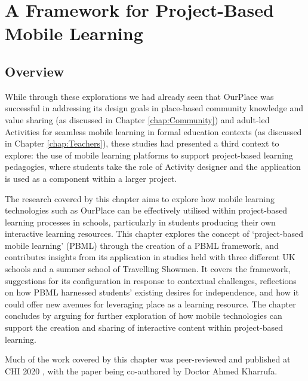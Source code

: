\chapter{A Framework for Project-Based Mobile Learning}
\label{chap:student-created}

\section{Overview}
While through these explorations we had already seen that OurPlace was successful in addressing its design goals in place-based community knowledge and value sharing (as discussed in Chapter \ref{chap:Community}) and adult-led Activities for seamless mobile learning in formal education contexts (as discussed in Chapter \ref{chap:Teachers}), these studies had presented a third context to explore: the use of mobile learning platforms to support project-based learning pedagogies, where students take the role of Activity designer and the application is used as a component within a larger project.

The research covered by this chapter aims to explore how mobile learning technologies such as OurPlace can be effectively utilised within project-based learning processes in schools, particularly in students producing their own interactive learning resources. This chapter explores the concept of `project-based mobile learning' (PBML) through the creation of a PBML framework, and contributes insights from its application in studies held with three different UK schools and a summer school of Travelling Showmen. It covers the framework, suggestions for its configuration in response to contextual challenges, reflections on how PBML harnessed students' existing desires for independence, and how it could offer new avenues for leveraging place as a learning resource. The chapter concludes by arguing for further exploration of how mobile technologies can support the creation and sharing of interactive content within project-based learning.

Much  of the work covered by this chapter was peer-reviewed and published at CHI 2020 \citep{Richardson2020}, with the paper being co-authored by Doctor Ahmed Kharrufa.

